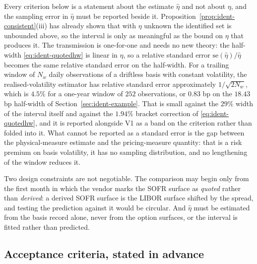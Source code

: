 \documentclass[../../../main.tex]{subfiles}
\begin{document}
Every criterion below is a statement about the estimate $\hat\eta$ and not about $\eta$, and the sampling error in $\hat\eta$ must be reported beside it. Proposition~\ref{prop:ident-consistent}(iii) has already shown that with $\eta$ unknown the identified set is unbounded above, so the interval is only as meaningful as the bound on $\eta$ that produces it. The transmission is one-for-one and needs no new theory: the half-width \eqref{eq:ident-quotedhw} is linear in $\eta$, so a relative standard error $\mathrm{se}(\hat\eta)/\hat\eta$ becomes the same relative standard error on the half-width. For a trailing window of $N_w$ daily observations of a driftless basis with constant volatility, the realised-volatility estimator has relative standard error approximately $1/\sqrt{2N_w}$, which is $4.5\%$ for a one-year window of $252$ observations, or $0.83$ bp on the $18.43$ bp half-width of Section~\ref{sec:ident-example}. That is small against the $29\%$ width of the interval itself and against the $1.94\%$ bracket correction of \eqref{eq:ident-quotedhw}, and it is reported alongside V1 as a band on the criterion rather than folded into it. What cannot be reported as a standard error is the gap between the physical-measure estimate and the pricing-measure quantity: that is a risk premium on basis volatility, it has no sampling distribution, and no lengthening of the window reduces it.

Two design constraints are not negotiable. The comparison may begin only from the first month in which the vendor marks the SOFR surface as \emph{quoted} rather than \emph{derived}: a derived SOFR surface is the LIBOR surface shifted by the spread, and testing the prediction against it would be circular. And $\hat\eta$ must be estimated from the basis record alone, never from the option surfaces, or the interval is fitted rather than predicted.

\subsection{Acceptance criteria, stated in advance}
\end{document}

